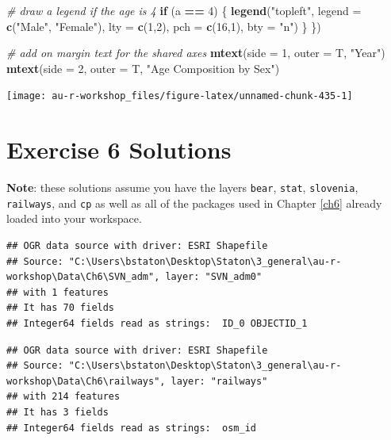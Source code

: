 \documentclass[]{book}
\newenvironment{Shaded}{\begin{snugshade}}{\end{snugshade}}
\newcommand{\CommentTok}[1]{\textcolor[rgb]{0.56,0.35,0.01}{\textit{#1}}}
\newcommand{\ControlFlowTok}[1]{\textcolor[rgb]{0.13,0.29,0.53}{\textbf{#1}}}
\newcommand{\DataTypeTok}[1]{\textcolor[rgb]{0.13,0.29,0.53}{#1}}
\newcommand{\DecValTok}[1]{\textcolor[rgb]{0.00,0.00,0.81}{#1}}
\newcommand{\KeywordTok}[1]{\textcolor[rgb]{0.13,0.29,0.53}{\textbf{#1}}}
\newcommand{\NormalTok}[1]{#1}
\newcommand{\OperatorTok}[1]{\textcolor[rgb]{0.81,0.36,0.00}{\textbf{#1}}}
\newcommand{\StringTok}[1]{\textcolor[rgb]{0.31,0.60,0.02}{#1}}
\begin{document}
\begin{Shaded}
\begin{Highlighting}[]
  \CommentTok{# draw a legend if the age is 4}
  \ControlFlowTok{if}\NormalTok{ (a }\OperatorTok{==}\StringTok{ }\DecValTok{4}\NormalTok{) \{}
    \KeywordTok{legend}\NormalTok{(}\StringTok{"topleft"}\NormalTok{, }\DataTypeTok{legend =} \KeywordTok{c}\NormalTok{(}\StringTok{"Male"}\NormalTok{, }\StringTok{"Female"}\NormalTok{),}
           \DataTypeTok{lty =} \KeywordTok{c}\NormalTok{(}\DecValTok{1}\NormalTok{,}\DecValTok{2}\NormalTok{), }\DataTypeTok{pch =} \KeywordTok{c}\NormalTok{(}\DecValTok{16}\NormalTok{,}\DecValTok{1}\NormalTok{), }\DataTypeTok{bty =} \StringTok{"n"}\NormalTok{)}
\NormalTok{  \}}
\NormalTok{\})}

\CommentTok{# add on margin text for the shared axes}
\KeywordTok{mtext}\NormalTok{(}\DataTypeTok{side =} \DecValTok{1}\NormalTok{, }\DataTypeTok{outer =}\NormalTok{ T, }\StringTok{"Year"}\NormalTok{)}
\KeywordTok{mtext}\NormalTok{(}\DataTypeTok{side =} \DecValTok{2}\NormalTok{, }\DataTypeTok{outer =}\NormalTok{ T, }\StringTok{"Age Composition by Sex"}\NormalTok{)}
\end{Highlighting}
\end{Shaded}

\begin{center}\texttt{[image: au-r-workshop\_files/figure-latex/unnamed-chunk-435-1]} \end{center}

\hypertarget{ex6-answers}{%
\section*{Exercise 6 Solutions}\label{ex6-answers}}

\textbf{Note}: these solutions assume you have the layers \texttt{bear}, \texttt{stat}, \texttt{slovenia}, \texttt{railways}, and \texttt{cp} as well as all of the packages used in Chapter \ref{ch6} already loaded into your workspace.

\begin{verbatim}
## OGR data source with driver: ESRI Shapefile 
## Source: "C:\Users\bstaton\Desktop\Staton\3_general\au-r-workshop\Data\Ch6\SVN_adm", layer: "SVN_adm0"
## with 1 features
## It has 70 fields
## Integer64 fields read as strings:  ID_0 OBJECTID_1
\end{verbatim}

\begin{verbatim}
## OGR data source with driver: ESRI Shapefile 
## Source: "C:\Users\bstaton\Desktop\Staton\3_general\au-r-workshop\Data\Ch6\railways", layer: "railways"
## with 214 features
## It has 3 fields
## Integer64 fields read as strings:  osm_id
\end{verbatim}
\end{document}
